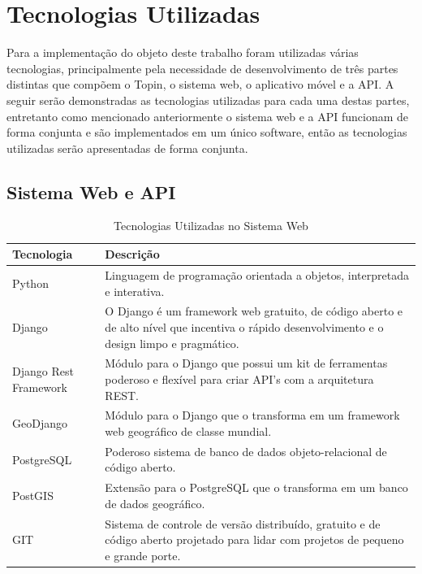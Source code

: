 {{{{{\section{Tecnologias Utilizadas}

Para a implementação do objeto deste trabalho foram utilizadas várias tecnologias, principalmente pela necessidade de desenvolvimento de três partes distintas que compõem o Topin, o sistema web, o aplicativo móvel e a API. A seguir serão demonstradas as tecnologias utilizadas para cada uma destas partes, entretanto como mencionado anteriormente o sistema web e a API funcionam de forma conjunta e são implementados em um único software, então as tecnologias utilizadas serão apresentadas de forma conjunta.

\subsection*{Sistema Web e API}

{\renewcommand{\arraystretch}{2}
\begin{table}[H]
\centering
\caption{Tecnologias Utilizadas no Sistema Web}
\label{tab:tecnologias-utilizadas-web}
\begin{tabular}{ l | p{11cm} }
\hline
\textbf{Tecnologia} & \textbf{Descrição} \\
\hline
Python\footnotemark & Linguagem de programação orientada a objetos, interpretada e interativa. \\ \hline
Django\footnotemark & O Django é um framework web gratuito, de código aberto e de alto nível que incentiva o rápido desenvolvimento e o design limpo e pragmático. \\ \hline
Django Rest Framework\footnotemark & Módulo para o Django que possui um kit de ferramentas poderoso e flexível para criar API's com a arquitetura REST. \\ \hline
GeoDjango\footnotemark & Módulo para o Django que o transforma em um framework web geográfico de classe mundial. \\ \hline
PostgreSQL\footnotemark & Poderoso sistema de banco de dados objeto-relacional de código aberto. \\ \hline
PostGIS\footnotemark & Extensão para o PostgreSQL que o transforma em um banco de dados geográfico. \\ \hline
GIT\footnotemark & Sistema de controle de versão distribuído, gratuito e de código aberto projetado para lidar com projetos de pequeno e grande porte. \\ \hline
\end{tabular}
\end{table}

}}}}}}
